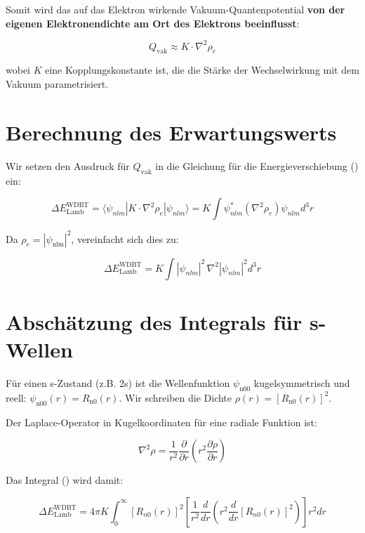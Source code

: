 Somit wird das auf das Elektron wirkende Vakuum-Quantenpotential \textbf{von der eigenen Elektronendichte am Ort des Elektrons beeinflusst}:

\begin{equation}
    Q_{\text{vak}} \approx K \cdot \nabla^2 \rho_e    
\end{equation}

wobei $K$ eine Kopplungskonstante ist, die die Stärke der Wechselwirkung mit dem Vakuum parametrisiert.

\section{Berechnung des Erwartungswerts}
Wir setzen den Ausdruck für $Q_\text{vak}$ in die Gleichung für die Energieverschiebung () ein:

\begin{equation}
    \Delta E_{\text{Lamb}}^{\text{WDBT}} = \langle \psi_{nlm} | K \cdot \nabla^2 \rho_e | \psi_{nlm} \rangle = K \int \psi_{nlm}^* (\nabla^2 \rho_e) \psi_{nlm}  d^3r
\end{equation}

Da $\rho_e = \left| \psi_\text{nlm}\right|^2$, vereinfacht sich dies zu:

\begin{equation}
    \label{eq:wdbt_lamb_shift_integral}
    \Delta E_{\text{Lamb}}^{\text{WDBT}} = K \int |\psi_{nlm}|^2 \, \nabla^2 |\psi_{nlm}|^2  d^3r
\end{equation}

\section{Abschätzung des Integrals für s-Wellen}
Für einen s-Zustand (z.B. 2s) ist die Wellenfunktion $\psi_\text{n00}$ kugelsymmetrisch und reell: $\psi_\text{n00}(r) = R_\text{n0}(r)$. Wir schreiben die Dichte $\rho(r) = [R_\text{n0}(r)]^2$.

Der Laplace-Operator in Kugelkoordinaten für eine radiale Funktion ist:

\begin{equation}
    \nabla^2 \rho = \frac{1}{r^2} \frac{\partial}{\partial r} \left( r^2 \frac{\partial \rho}{\partial r} \right)
\end{equation}

Das Integral () wird damit:

\begin{equation}
    \Delta E_{\text{Lamb}}^{\text{WDBT}} = 4\pi K \int_0^\infty [R_{n0}(r)]^2 \left[ \frac{1}{r^2} \frac{d}{dr} \left( r^2 \frac{d}{dr} [R_{n0}(r)]^2 \right) \right] r^2 dr
\end{equation}

